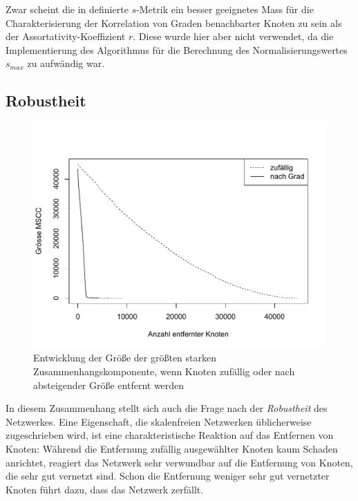 Zwar scheint die in \cite{Li2005} definierte $s$-Metrik ein besser
geeignetes Mass für die Charakterisierung der Korrelation von Graden
benachbarter Knoten zu sein als der Assortativity-Koeffizient
$r$. Diese wurde hier aber nicht verwendet, da die Implementierung des
Algorithmus für die Berechnung des Normalisierungswertes $s_{max}$ zu
aufwändig war.

\subsection{Robustheit}
\label{sec:robustheit}

\begin{figure}[ht!]
  \centering
  \includegraphics[scale=0.45]{images/without.pdf}
  \caption{Entwicklung der Größe der größten starken
    Zusammenhangskomponente, wenn Knoten zufällig oder nach absteigender
    Größe entfernt werden}
  \label{fig:without}
\end{figure}

In diesem Zusammenhang stellt sich auch die Frage nach der
\emph{Robustheit} des Netzwerkes.  Eine Eigenschaft, die skalenfreien
Netzwerken üblicherweise zugeschrieben wird, ist eine
charakteristische Reaktion auf das Entfernen von Knoten: Während die
Entfernung zufällig ausgewählter Knoten kaum Schaden anrichtet,
reagiert das Netzwerk sehr verwundbar auf die Entfernung von Knoten,
die sehr gut vernetzt sind. Schon die Entfernung weniger sehr gut
vernetzter Knoten führt dazu, dass das Netzwerk
zerfällt\cite{Albert2000}.

